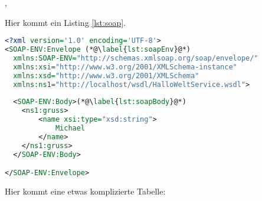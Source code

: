 


























\cite{Gray1981}, \cite{Cerami2002}

\noindent Hier kommt ein Listing \ref{lst:soap}.

\begin{center}
\begin{lstlisting}[caption={SOAP Anfrage an einen HalloWelt-Web-Service},label=lst:soap,language=XML,label={lst:soap}]
<?xml version='1.0' encoding='UTF-8'>
<SOAP-ENV:Envelope (*@\label{lst:soapEnv}@*)
  xmlns:SOAP-ENV="http://schemas.xmlsoap.org/soap/envelope/"
  xmlns:xsi="http://www.w3.org/2001/XMLSchema-instance"
  xmlns:xsd="http://www.w3.org/2001/XMLSchema"
  xmlns:ns1="http://localhost/wsdl/HalloWeltService.wsdl">
  
  <SOAP-ENV:Body>(*@\label{lst:soapBody}@*)
  	<ns1:gruss>
  		<name xsi:type="xsd:string">
  			Michael
  		</name>
  	</ns1:gruss>
  </SOAP-ENV:Body>

</SOAP-ENV:Envelope>
\end{lstlisting}
\end{center}

\noindent Hier kommt eine etwas komplizierte Tabelle:

